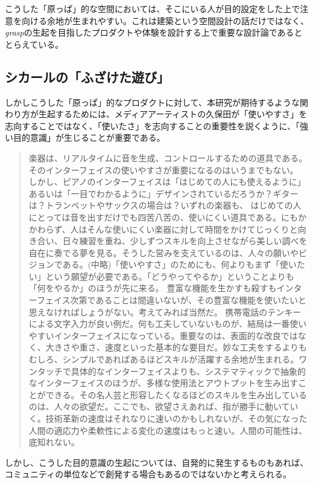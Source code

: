 こうした「原っぱ」的な空間においては、そこにいる人が目的設定をした上で注意を向ける余地が生まれやすい。これは建築という空間設計の話だけではなく、\textit{grasp}の生起を目指したプロダクトや体験を設計する上で重要な設計論であるととらえている。

\subsection{シカールの「ふざけた遊び」}
しかしこうした「原っぱ」的なプロダクトに対して、本研究が期待するような関わり方が生起するためには、メディアアーティストの久保田が「使いやすさ」を志向することではなく、「使いたさ」を志向することの重要性を説くように、「強い目的意識」が生じることが重要である。

\begin{quote}
  楽器は、リアルタイムに音を生成、コントロールするための道具である。そのインターフェイスの使いやすさが重要になるのはいうまでもない。 しかし、ピアノのインターフェイスは「はじめての人にも使えるように」あるいは「一目でわかるように」デザインされているだろうか？ギターは？トランペットやサックスの場合は？いずれの楽器も、 はじめての人にとっては音を出すだけでも四苦八苦の、使いにくい道具である。にもかかわらず、人はそんな使いにくい楽器に対して時間をかけてじっくりと向き合い、日々練習を重ね、少しずつスキルを向上させながら美しい調べを自在に奏でる夢を見る。そうした営みを支えているのは、人々の願いやビジョンである。(中略)「使いやすさ」のためにも、何よりもまず「使いたい」という願望が必要である。「どうやってやるか」ということよりも「何をやるか」のほうが先に来る。 豊富な機能を生かすも殺すもインターフェイス次第であることは間違いないが、その豊富な機能を使いたいと思えなければしょうがない。考えてみれば当然だ。 携帯電話のテンキーによる文字入力が良い例だ。何も工夫していないものが、結局は一番使いやすいインターフェイスになっている。重要なのは、表面的な改良ではなく、大きさや重さ、速度といった基本的な要目だ。妙な工夫をするよりもむしろ、シンプルであればあるほどスキルが活躍する余地が生まれる。ワンタッチで具体的なインターフェイスよりも、システマティックで抽象的なインターフェイスのほうが、多様な使用法とアウトプットを生み出すことができる。その名人芸と形容したくなるほどのスキルを生み出しているのは、人々の欲望だ。ここでも、欲望さえあれば、指が勝手に動いていく。技術革新の速度はそれなりに速いのかもしれないが、その気になった人間の適応力や柔軟性による変化の速度はもっと速い。人間の可能性は、底知れない。
\end{quote}

しかし、こうした目的意識の生起については、自発的に発生するものもあれば、コミュニティの単位などで創発する場合もあるのではないかと考えられる。

